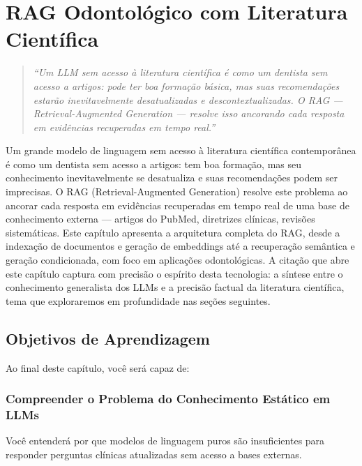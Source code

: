 \chapter{RAG Odontológico com Literatura Científica}
\label{cap:rag-odontologico}
\nivelquatro

\begin{quote}
\textit{``Um LLM sem acesso à literatura científica é como um dentista sem acesso a artigos: pode ter boa formação básica, mas suas recomendações estarão inevitavelmente desatualizadas e descontextualizadas. O RAG --- Retrieval-Augmented Generation --- resolve isso ancorando cada resposta em evidências recuperadas em tempo real.''}
\end{quote}

Um grande modelo de linguagem sem acesso à literatura científica contemporânea é como um dentista sem acesso a artigos: tem boa formação, mas seu conhecimento inevitavelmente se desatualiza e suas recomendações podem ser imprecisas. O RAG (Retrieval-Augmented Generation) resolve este problema ao ancorar cada resposta em evidências recuperadas em tempo real de uma base de conhecimento externa --- artigos do PubMed, diretrizes clínicas, revisões sistemáticas. Este capítulo apresenta a arquitetura completa do RAG, desde a indexação de documentos e geração de embeddings até a recuperação semântica e geração condicionada, com foco em aplicações odontológicas. A citação que abre este capítulo captura com precisão o espírito desta tecnologia: a síntese entre o conhecimento generalista dos LLMs e a precisão factual da literatura científica, tema que exploraremos em profundidade nas seções seguintes.

\section{Objetivos de Aprendizagem}

Ao final deste capítulo, você será capaz de:

\subsection{Compreender o Problema do Conhecimento Estático em LLMs}
Você entenderá por que modelos de linguagem puros são insuficientes para responder perguntas clínicas atualizadas sem acesso a bases externas.

